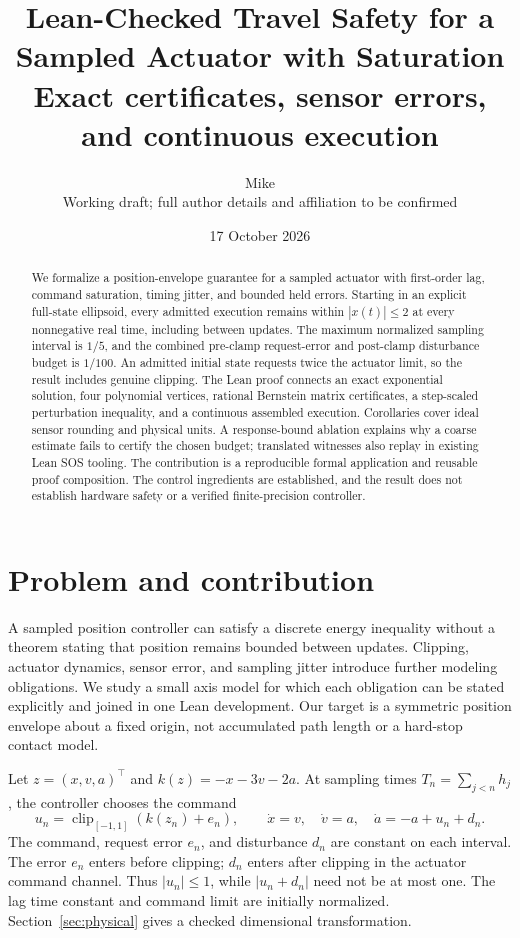 \documentclass[10pt]{article}
\title{Lean-Checked Travel Safety for a Sampled Actuator with Saturation\\[3pt]
\large Exact certificates, sensor errors, and continuous execution}
\author{Mike\\\small Working draft; full author details and affiliation to be confirmed}
\date{17 October 2026}
\newcommand{\clip}{\operatorname{clip}}
\begin{document}
\maketitle
\begin{abstract}
We formalize a position-envelope guarantee for a sampled actuator with first-order lag, command saturation, timing jitter, and bounded held errors. Starting in an explicit full-state ellipsoid, every admitted execution remains within $|x(t)|\le2$ at every nonnegative real time, including between updates. The maximum normalized sampling interval is $1/5$, and the combined pre-clamp request-error and post-clamp disturbance budget is $1/100$. An admitted initial state requests twice the actuator limit, so the result includes genuine clipping. The Lean proof connects an exact exponential solution, four polynomial vertices, rational Bernstein matrix certificates, a step-scaled perturbation inequality, and a continuous assembled execution. Corollaries cover ideal sensor rounding and physical units. A response-bound ablation explains why a coarse estimate fails to certify the chosen budget; translated witnesses also replay in existing Lean SOS tooling. The contribution is a reproducible formal application and reusable proof composition. The control ingredients are established, and the result does not establish hardware safety or a verified finite-precision controller.
\end{abstract}

\section{Problem and contribution}
A sampled position controller can satisfy a discrete energy inequality without a theorem stating that position remains bounded between updates. Clipping, actuator dynamics, sensor error, and sampling jitter introduce further modeling obligations. We study a small axis model for which each obligation can be stated explicitly and joined in one Lean development. Our target is a symmetric position envelope about a fixed origin, not accumulated path length or a hard-stop contact model.

Let $z=(x,v,a)^\top$ and $k(z)=-x-3v-2a$. At sampling times $T_n=\sum_{j<n}h_j$, the controller chooses the command
\begin{equation}\label{eq:plant}
 u_n=\clip_{[-1,1]}(k(z_n)+e_n),\qquad
 \dot x=v,\quad \dot v=a,\quad \dot a=-a+u_n+d_n.
\end{equation}
The command, request error $e_n$, and disturbance $d_n$ are constant on each interval. The error $e_n$ enters before clipping; $d_n$ enters after clipping in the actuator command channel. Thus $|u_n|\le1$, while $|u_n+d_n|$ need not be at most one. The lag time constant and command limit are initially normalized. Section~\ref{sec:physical} gives a checked dimensional transformation.
\end{document}
